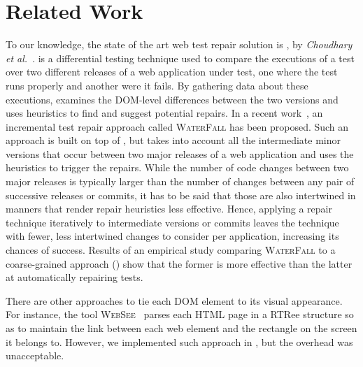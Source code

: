 \section{Related Work}\label{sec:relwork}

 To our knowledge, the state of the art web test repair solution is \water, by \textit{Choudhary et al.}~\cite{Choudhary:2011:WWA:2002931.2002935}. \water is a differential testing technique used to compare the executions of a test over two different releases of a web application under test, one where the test runs properly and another were it fails. By gathering data about these executions, \water examines the DOM-level differences between the two versions and uses heuristics to find and suggest potential repairs.
%
In a recent work~\cite{Hammoudi-2016-FSE}, an incremental test repair approach called \textsc{WaterFall} has been proposed. 
Such an approach is built on top of \water, but takes into account all the intermediate minor versions that occur between two major releases of a web application and uses the \water heuristics to trigger the repairs. While the number of code changes between two major releases is typically larger than the number of changes between any pair of successive releases or commits, it has to be said that those are also intertwined in manners that render repair heuristics less effective. Hence, applying a repair technique iteratively to intermediate versions or commits leaves the technique with fewer, less intertwined changes to consider per application, increasing its chances of success.
Results of an empirical study comparing \textsc{WaterFall} to a coarse-grained approach (\water) show that the former is more effective than the latter at automatically repairing tests.



There are other approaches to tie each DOM element to its visual appearance. For instance, the tool \textsc{WebSee}~\cite{} parses each HTML page in a RTRee structure so as to maintain the link between each web element and the rectangle on the screen it belongs to. However, we implemented such approach in \tool, but the overhead was unacceptable.

